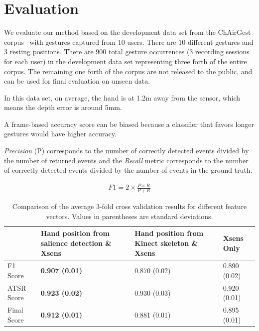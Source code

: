 \chapter{Evaluation}\label{sec:evaluation}
We evaluate our method based on the development data set from the ChAirGest
corpus~\cite{Ruffieux2013} with gestures captured from 10 users. There are
10 different gestures and 3 resting positions. There are 900 total gesture
occurrences (3 recording sessions for each user) in the development data set representing three forth of the entire corpus. The remaining one forth of the corpus are not released to
the public, and can be used for final evaluation on unseen data.

In this data set, on average, the hand is at 1.2m away
from the sensor, which means the depth error is around 5mm.

A frame-based accuracy score can be biased because a classifier that
favors longer gestures would have higher accuracy.

\textit{Precision} (P) corresponds to the number of correctly detected events
divided by the number of returned events and the \textit{Recall} metric
corresponds to the number of correctly detected events divided by the number of
events in the ground truth. \cite{Ruffieux2013}

\begin{align}
F1 = 2\times\frac{P \times R}{P + R}
\end{align}

\begin{table}[h]
\begin{center}
\begin{tabular}{|l|p{2cm}|p{1.7cm}|p{1.7cm}|}
\hline
 & Hand position from salience detection \& Xsens & Hand position
 from Kinect skeleton \& Xsens & Xsens Only \\
\hline
F1 Score & \textbf{0.907 (0.01)} & 0.870 (0.02) & 0.890 (0.02) \\
\hline
ATSR Score & \textbf{0.923 (0.02)} & 0.930 (0.03) & 0.920 (0.01) \\
\hline
Final Score & \textbf{0.912 (0.01)} & 0.881 (0.01) & 0.895 (0.01) \\
\hline
\end{tabular}
\caption{Comparison of the average 3-fold cross validation results for different
feature vectors. Values in parentheses are standard deviations.}
\label{tab:comp-feature}
\end{center}
\end{table}

